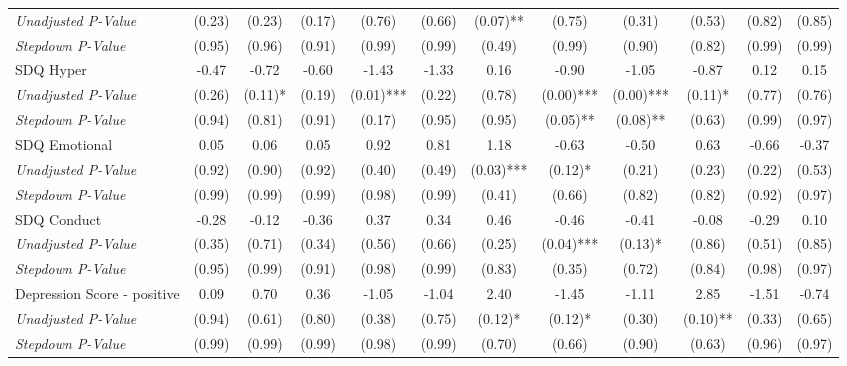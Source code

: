 \begin{tabular}{l c c c c c c c c c c c}
\quad \textit{Unadjusted P-Value} & (0.23) & (0.23) & (0.17) & (0.76) & (0.66) & (0.07)** & (0.75) & (0.31) & (0.53) & (0.82) & (0.85) \\
\quad \textit{Stepdown P-Value} & (0.95) & (0.96) & (0.91) & (0.99) & (0.99) & (0.49) & (0.99) & (0.90) & (0.82) & (0.99) & (0.99) \\
SDQ Hyper & -0.47 & -0.72 & -0.60 & -1.43 & -1.33 & 0.16 & -0.90 & -1.05 & -0.87 & 0.12 & 0.15 \\
\quad \textit{Unadjusted P-Value} & (0.26) & (0.11)* & (0.19) & (0.01)*** & (0.22) & (0.78) & (0.00)*** & (0.00)*** & (0.11)* & (0.77) & (0.76) \\
\quad \textit{Stepdown P-Value} & (0.94) & (0.81) & (0.91) & (0.17) & (0.95) & (0.95) & (0.05)** & (0.08)** & (0.63) & (0.99) & (0.97) \\
SDQ Emotional & 0.05 & 0.06 & 0.05 & 0.92 & 0.81 & 1.18 & -0.63 & -0.50 & 0.63 & -0.66 & -0.37 \\
\quad \textit{Unadjusted P-Value} & (0.92) & (0.90) & (0.92) & (0.40) & (0.49) & (0.03)*** & (0.12)* & (0.21) & (0.23) & (0.22) & (0.53) \\
\quad \textit{Stepdown P-Value} & (0.99) & (0.99) & (0.99) & (0.98) & (0.99) & (0.41) & (0.66) & (0.82) & (0.82) & (0.92) & (0.97) \\
SDQ Conduct & -0.28 & -0.12 & -0.36 & 0.37 & 0.34 & 0.46 & -0.46 & -0.41 & -0.08 & -0.29 & 0.10 \\
\quad \textit{Unadjusted P-Value} & (0.35) & (0.71) & (0.34) & (0.56) & (0.66) & (0.25) & (0.04)*** & (0.13)* & (0.86) & (0.51) & (0.85) \\
\quad \textit{Stepdown P-Value} & (0.95) & (0.99) & (0.91) & (0.98) & (0.99) & (0.83) & (0.35) & (0.72) & (0.84) & (0.98) & (0.97) \\
Depression Score - positive & 0.09 & 0.70 & 0.36 & -1.05 & -1.04 & 2.40 & -1.45 & -1.11 & 2.85 & -1.51 & -0.74 \\
\quad \textit{Unadjusted P-Value} & (0.94) & (0.61) & (0.80) & (0.38) & (0.75) & (0.12)* & (0.12)* & (0.30) & (0.10)** & (0.33) & (0.65) \\
\quad \textit{Stepdown P-Value} & (0.99) & (0.99) & (0.99) & (0.98) & (0.99) & (0.70) & (0.66) & (0.90) & (0.63) & (0.96) & (0.97) \\
\bottomrule
\end{tabular}
